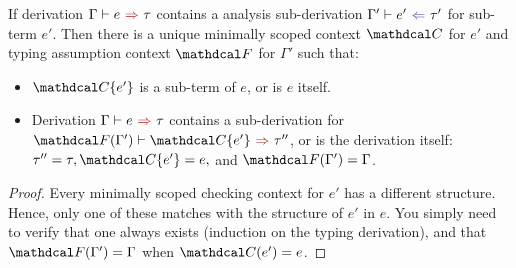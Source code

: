 \begin{proposition}
\label{def:CheckingContextInProgram}
If derivation $\synthesis{e}{\tau}$ contains a analysis sub-derivation $\analysis[\Gamma']{e'}{\tau'}$ for sub-term $e'$. Then there is a unique minimally scoped context $\C$ for $e'$ and typing assumption context $\F$ for $\Gamma'$ such that:
\begin{itemize}
\item $\C\{e'\}$ is a sub-term of $e$, or is $e$ itself.
\item Derivation $\synthesis{e}{\tau}$ contains a sub-derivation for $\synthesis[\F(\Gamma')]{\C\{e'\}}{\tau''}$, or is the derivation itself: $\tau'' = \tau, \C\{e'\} = e,$ and $\F(\Gamma') = \Gamma$.
\end{itemize}
\end{proposition}
\begin{proof}
Every minimally scoped checking context for $e'$ has a different structure. Hence, only one of these matches with the structure of $e'$ in $e$. You simply need to verify that one always exists (induction on the typing derivation), and that $\F(\Gamma') = \Gamma$ when $\C(e') = e$.
\end{proof}

